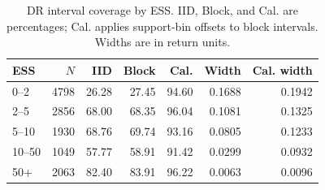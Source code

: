 \begin{table}[t]
\centering\scriptsize
\setlength{\tabcolsep}{3pt}
\caption{DR interval coverage by ESS. IID, Block, and Cal. are percentages; Cal. applies support-bin offsets to block intervals. Widths are in return units.}
\label{tab:ope_by_support}
\begin{tabular}{lrrrrrr}
\toprule
ESS & $N$ & IID & Block & Cal. & Width & Cal. width \\
\midrule
0--2 & 4798 & 26.28 & 27.45 & 94.60 & 0.1688 & 0.1942 \\
2--5 & 2856 & 68.00 & 68.35 & 96.04 & 0.1081 & 0.1325 \\
5--10 & 1930 & 68.76 & 69.74 & 93.16 & 0.0805 & 0.1233 \\
10--50 & 1049 & 57.77 & 58.91 & 91.42 & 0.0299 & 0.0932 \\
50+ & 2063 & 82.40 & 83.91 & 96.22 & 0.0063 & 0.0096 \\
\bottomrule
\end{tabular}
\end{table}
